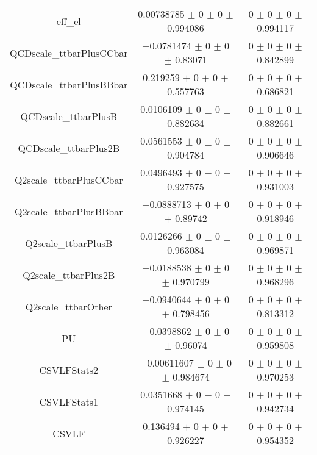 \begin{table}
\begin{tabular}{ccc}
eff\_el 	& \num{0.00738785} $\pm$ \num{0} $\pm$ \num{0} $\pm$ \num{0.994086} 	& \num{0} $\pm$ \num{0} $\pm$ \num{0} $\pm$ \num{0.994117}\\
QCDscale\_ttbarPlusCCbar 	& \num{-0.0781474} $\pm$ \num{0} $\pm$ \num{0} $\pm$ \num{0.83071} 	& \num{0} $\pm$ \num{0} $\pm$ \num{0} $\pm$ \num{0.842899}\\
QCDscale\_ttbarPlusBBbar 	& \num{0.219259} $\pm$ \num{0} $\pm$ \num{0} $\pm$ \num{0.557763} 	& \num{0} $\pm$ \num{0} $\pm$ \num{0} $\pm$ \num{0.686821}\\
QCDscale\_ttbarPlusB 	& \num{0.0106109} $\pm$ \num{0} $\pm$ \num{0} $\pm$ \num{0.882634} 	& \num{0} $\pm$ \num{0} $\pm$ \num{0} $\pm$ \num{0.882661}\\
QCDscale\_ttbarPlus2B 	& \num{0.0561553} $\pm$ \num{0} $\pm$ \num{0} $\pm$ \num{0.904784} 	& \num{0} $\pm$ \num{0} $\pm$ \num{0} $\pm$ \num{0.906646}\\
Q2scale\_ttbarPlusCCbar 	& \num{0.0496493} $\pm$ \num{0} $\pm$ \num{0} $\pm$ \num{0.927575} 	& \num{0} $\pm$ \num{0} $\pm$ \num{0} $\pm$ \num{0.931003}\\
Q2scale\_ttbarPlusBBbar 	& \num{-0.0888713} $\pm$ \num{0} $\pm$ \num{0} $\pm$ \num{0.89742} 	& \num{0} $\pm$ \num{0} $\pm$ \num{0} $\pm$ \num{0.918946}\\
Q2scale\_ttbarPlusB 	& \num{0.0126266} $\pm$ \num{0} $\pm$ \num{0} $\pm$ \num{0.963084} 	& \num{0} $\pm$ \num{0} $\pm$ \num{0} $\pm$ \num{0.969871}\\
Q2scale\_ttbarPlus2B 	& \num{-0.0188538} $\pm$ \num{0} $\pm$ \num{0} $\pm$ \num{0.970799} 	& \num{0} $\pm$ \num{0} $\pm$ \num{0} $\pm$ \num{0.968296}\\
Q2scale\_ttbarOther 	& \num{-0.0940644} $\pm$ \num{0} $\pm$ \num{0} $\pm$ \num{0.798456} 	& \num{0} $\pm$ \num{0} $\pm$ \num{0} $\pm$ \num{0.813312}\\
PU 	& \num{-0.0398862} $\pm$ \num{0} $\pm$ \num{0} $\pm$ \num{0.96074} 	& \num{0} $\pm$ \num{0} $\pm$ \num{0} $\pm$ \num{0.959808}\\
CSVLFStats2 	& \num{-0.00611607} $\pm$ \num{0} $\pm$ \num{0} $\pm$ \num{0.984674} 	& \num{0} $\pm$ \num{0} $\pm$ \num{0} $\pm$ \num{0.970253}\\
CSVLFStats1 	& \num{0.0351668} $\pm$ \num{0} $\pm$ \num{0} $\pm$ \num{0.974145} 	& \num{0} $\pm$ \num{0} $\pm$ \num{0} $\pm$ \num{0.942734}\\
CSVLF 	& \num{0.136494} $\pm$ \num{0} $\pm$ \num{0} $\pm$ \num{0.926227} 	& \num{0} $\pm$ \num{0} $\pm$ \num{0} $\pm$ \num{0.954352}\\

\end{tabular}
\end{table}
